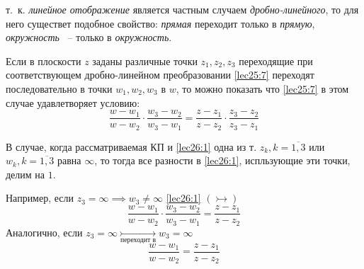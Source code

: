 \documentclass[../../main.tex]{subfiles}
\begin{document}
т.~к. \emph{линейное отображение}
является частным случаем \emph{дробно-линейного}, то для него существет
подобное свойство: \emph{прямая} переходит только в \emph{прямую},
\emph{окружность} ~-- только в \emph{окружность}.

Если в плоскости \textcircled{$z$} заданы различные точки $z_1, z_2, z_3$
переходящие при соответствующем дробно-линейном преобразовании 
\eqref{lec25:7} переходят последовательно в точки $w_1, w_2, w_3$ в 
\textcircled{$w$}, то можно показать что \eqref{lec25:7} в этом случае
удавлетворяет условию:
\begin{equation}
\label{lec26:1} \frac{w - w_1}{w - w_2} \cdot \frac{w_3 - w_2}{w_3 - w_1} = 
\frac{z - z_1}{z - z_2} \cdot \frac{z_3 - z_2}{z_3 - z_1}
\end{equation}

В случае, когда рассматриваемая КП и \eqref{lec26:1} одна из т.
$z_k , k = \overline{1,3}$ или $w_k , k = \overline{1,3}$ равна 
$\infty$, то тогда все разности в \eqref{lec26:1}, испльзующие 
эти точки, делим на $1$.

Например, если $z_3 = \infty \implies w_3 \neq \infty$ 
\eqref{lec26:1} $(\rightarrowtail)$
\[
\frac{w - w_1}{w - w_2} \cdot \frac{w_3 - w_2}{w_3 - w_1} = 
\frac{z - z_1}{z - z_2}
\]
Аналогично, если 
$z_3 = \infty \underset{\text{переходит в}}{\rightarrowtail} w_3 = \infty$
\[
\frac{w - w_1}{w - w_2} = \frac{z - z_1}{z - z_2}
\]
\end{document}

